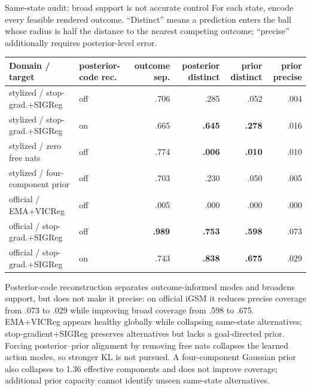 \documentclass[aspectratio=169,10pt]{beamer}
\newcommand{\good}[1]{\textcolor{cgreen}{\textbf{#1}}}
\newcommand{\bad}[1]{\textcolor{cred}{\textbf{#1}}}
\begin{document}
\begin{frame}{Same-state audit: broad support is not accurate control}
\scriptsize
For each state, encode every feasible rendered outcome. ``Distinct'' means a
prediction enters the ball whose radius is half the distance to the nearest
competing outcome; ``precise'' additionally requires posterior-level error.

\medskip
\centering
\begin{tabular}{llrrrr}
\toprule
Domain / target & posterior-code rec. & outcome sep. & posterior distinct & prior distinct & prior precise\\
\midrule
stylized / stop-grad.+SIGReg & off & .706 & .285 & .052 & .004\\
stylized / stop-grad.+SIGReg & on & .665 & \good{.645} & \good{.278} & .016\\
stylized / zero free nats & off & .774 & \bad{.006} & \bad{.010} & .010\\
stylized / four-component prior & off & .703 & .230 & .050 & .005\\
official / EMA+VICReg & off & .005 & .000 & .000 & .000\\
official / stop-grad.+SIGReg & off & \good{.989} & \good{.753} & \good{.598} & .073\\
official / stop-grad.+SIGReg & on & .743 & \good{.838} & \good{.675} & .029\\
\bottomrule
\end{tabular}

\medskip
\raggedright
Posterior-code reconstruction separates outcome-informed modes and broadens
support, but does not make it precise: on official iGSM it reduces precise
coverage from .073 to .029 while improving broad coverage from .598 to .675.
EMA+VICReg appears healthy globally while collapsing same-state alternatives;
stop-gradient+SIGReg preserves alternatives but lacks a goal-directed prior.
Forcing posterior--prior alignment by removing free nats collapses the learned
action modes, so stronger KL is not pursued. A four-component Gaussian prior
also collapses to 1.36 effective components and does not improve coverage;
additional prior capacity cannot identify unseen same-state alternatives.
\end{frame}
\end{document}
